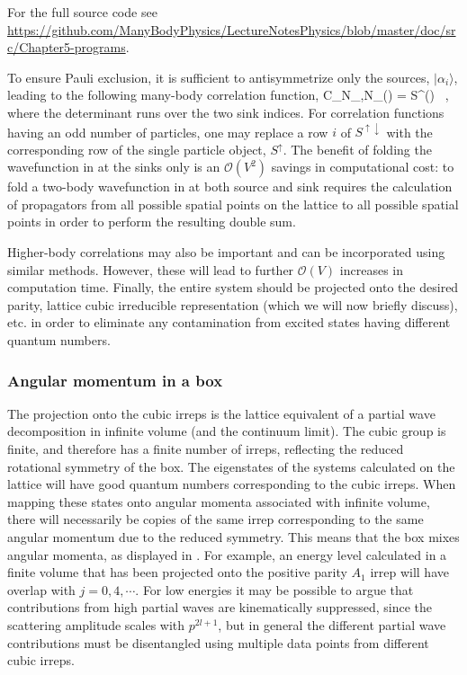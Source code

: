 For the full source code see \url{https://github.com/ManyBodyPhysics/LectureNotesPhysics/blob/master/doc/src/Chapter5-programs}.


To ensure Pauli exclusion, it is sufficient to antisymmetrize only the sources, $|\alpha_i \rangle$, leading to the following many-body correlation function,
\beq
C_{N_{\uparrow},N_{\downarrow}}(\tau) = \langle \det S^{\uparrow \downarrow}(\tau) \rangle \ ,
\eeq 
where the determinant runs over the two sink indices. For correlation functions having an odd number of particles, one may replace a row $i$ of $S^{\uparrow\downarrow}$ with the corresponding row of the single particle object, $S^{\uparrow}$. The benefit of folding the wavefunction in at the sinks only is an ${\mathcal{ O}}(V^2)$ savings in computational cost: to fold a two-body wavefunction in at both source and sink requires the calculation of propagators from all possible spatial points on the lattice to all possible spatial points in order to perform the resulting double sum. 

Higher-body correlations may also be important and can be incorporated using similar methods. However, these will lead to further ${\mathcal{ O}}(V)$ increases in computation time. Finally, the entire system should be projected onto the desired parity, lattice cubic irreducible representation (which we will now briefly discuss), etc. in order to eliminate any contamination from excited states having different quantum numbers. 

\subsubsection{Angular momentum in a box}

The projection onto the cubic irreps is the lattice equivalent of a partial wave decomposition in infinite volume (and the continuum limit). The cubic group is finite, and therefore has a finite number of irreps, reflecting the reduced rotational symmetry of the box. The eigenstates of the systems calculated on the lattice will have good quantum numbers corresponding to the cubic irreps. When mapping these states onto angular momenta associated with infinite volume, there will necessarily be copies of the same irrep corresponding to the same angular momentum due to the reduced symmetry. This means that the box mixes angular momenta, as displayed in . For example, an energy level calculated in a finite volume that has been projected onto the positive parity $A_1$ irrep will have overlap with $j=0,4,\cdots$. For low energies it may be possible to argue that contributions from high partial waves are kinematically suppressed, since the scattering amplitude scales with $p^{2l+1}$, but in general the different partial wave contributions must be disentangled using multiple data points from different cubic irreps. 

